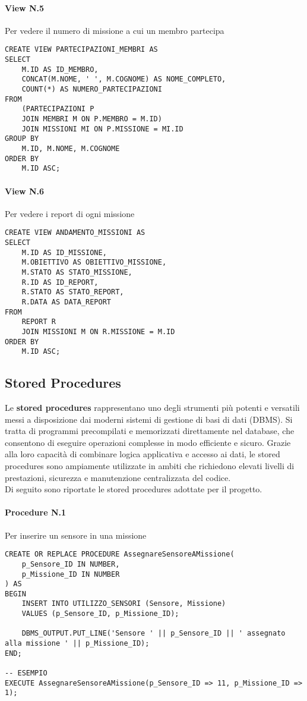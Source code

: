 \paragraph{View N.5} Per vedere il numero di missione a cui un membro partecipa
\begin{lstlisting}
CREATE VIEW PARTECIPAZIONI_MEMBRI AS
SELECT
    M.ID AS ID_MEMBRO,
    CONCAT(M.NOME, ' ', M.COGNOME) AS NOME_COMPLETO,
    COUNT(*) AS NUMERO_PARTECIPAZIONI
FROM
    (PARTECIPAZIONI P
    JOIN MEMBRI M ON P.MEMBRO = M.ID)
    JOIN MISSIONI MI ON P.MISSIONE = MI.ID
GROUP BY
    M.ID, M.NOME, M.COGNOME
ORDER BY
    M.ID ASC;
\end{lstlisting}

\paragraph{View N.6} Per vedere i report di ogni missione
\begin{lstlisting}
CREATE VIEW ANDAMENTO_MISSIONI AS
SELECT
    M.ID AS ID_MISSIONE,
    M.OBIETTIVO AS OBIETTIVO_MISSIONE,
    M.STATO AS STATO_MISSIONE,
    R.ID AS ID_REPORT,
    R.STATO AS STATO_REPORT,
    R.DATA AS DATA_REPORT
FROM
    REPORT R
    JOIN MISSIONI M ON R.MISSIONE = M.ID
ORDER BY 
    M.ID ASC;
\end{lstlisting}

\subsection{Stored Procedures}
Le \textbf{stored procedures} rappresentano uno degli strumenti più potenti e versatili messi a disposizione dai moderni sistemi di gestione di basi di dati (DBMS). Si tratta di programmi precompilati e memorizzati direttamente nel database, che consentono di eseguire operazioni complesse in modo efficiente e sicuro. Grazie alla loro capacità di combinare logica applicativa e accesso ai dati, le stored procedures sono ampiamente utilizzate in ambiti che richiedono elevati livelli di prestazioni, sicurezza e manutenzione centralizzata del codice.
\newline
\\Di seguito sono riportate le stored procedures adottate per il progetto.
\newline
\paragraph{Procedure N.1} Per inserire un sensore in una missione
\begin{lstlisting}
CREATE OR REPLACE PROCEDURE AssegnareSensoreAMissione(
    p_Sensore_ID IN NUMBER,
    p_Missione_ID IN NUMBER
) AS
BEGIN
    INSERT INTO UTILIZZO_SENSORI (Sensore, Missione)
    VALUES (p_Sensore_ID, p_Missione_ID);
    
    DBMS_OUTPUT.PUT_LINE('Sensore ' || p_Sensore_ID || ' assegnato alla missione ' || p_Missione_ID);
END;

-- ESEMPIO
EXECUTE AssegnareSensoreAMissione(p_Sensore_ID => 11, p_Missione_ID => 1);
\end{lstlisting}

